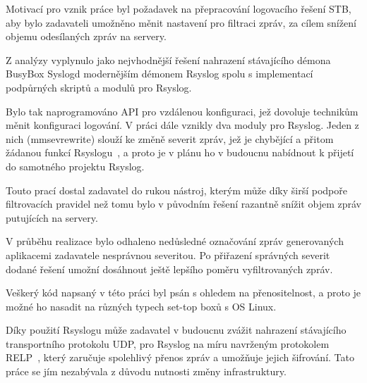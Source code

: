 \documentclass[thesis=B,czech]{FITthesis}[2012/06/26]
\begin{document}
\begin{conclusion}
Motivací pro vznik práce byl požadavek na přepracování logovacího řešení STB, aby bylo zadavateli umožněno měnit nastavení pro filtraci zpráv, za cílem snížení objemu odesílaných zpráv na servery.

Z analýzy vyplynulo jako nejvhodnější řešení nahrazení stávajícího démona BusyBox Syslogd modernějším démonem Rsyslog spolu s implementací podpůrných skriptů a modulů pro Rsyslog.
 
Bylo tak naprogramováno API pro vzdálenou konfiguraci, jež dovoluje technikům měnit konfiguraci logování. V práci dále vznikly dva moduly pro Rsyslog. Jeden z nich (mmsevrewrite) slouží ke změně severit zpráv, jež je chybějící a přitom žádanou funkcí Rsyslogu~\cite{rsysMailingList}, a proto je v plánu ho v budoucnu nabídnout k přijetí do samotného projektu Rsyslog.

Touto prací dostal zadavatel do rukou nástroj, kterým může díky širší podpoře filtrovacích pravidel než tomu bylo v původním řešení razantně snížit objem zpráv putujících na servery.

V průběhu realizace bylo odhaleno nedůsledné označování zpráv generovaných aplikacemi zadavatele nesprávnou severitou. Po přiřazení správných severit dodané řešení umožní dosáhnout ještě lepšího poměru vyfiltrovaných zpráv.

Veškerý kód napsaný v této práci byl psán s ohledem na přenositelnost, a proto je možné ho nasadit na různých typech set-top boxů s OS Linux.

Díky použití Rsyslogu může zadavatel v budoucnu zvážit nahrazení stávajícího  transportního protokolu UDP, pro Rsyslog na míru navrženým protokolem RELP~\cite{RsyslogRELP}, který zaručuje spolehlivý přenos zpráv a umožňuje jejich šifrování. Tato práce se jím nezabývala z důvodu nutnosti změny infrastruktury.

\end{conclusion}




\appendix
\end{document}
